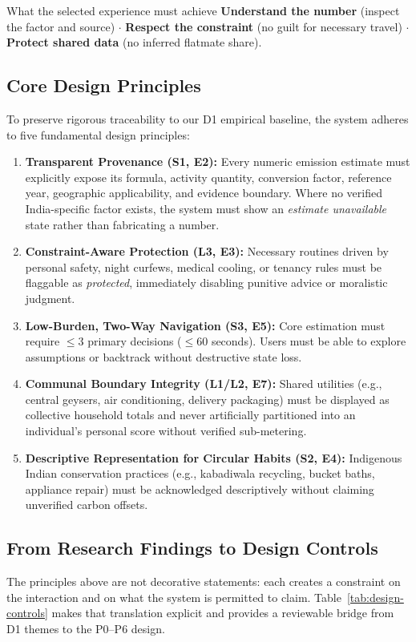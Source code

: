 \documentclass[12pt,a4paper]{article}
\begin{document}
\begin{chapterfocus}{What the selected experience must achieve}
\textbf{Understand the number} (inspect the factor and source) \quad $\cdot$ \quad
\textbf{Respect the constraint} (no guilt for necessary travel) \quad $\cdot$ \quad
\textbf{Protect shared data} (no inferred flatmate share).
\end{chapterfocus}

\subsection{Core Design Principles}
To preserve rigorous traceability to our D1 empirical baseline, the system adheres to five fundamental design principles:
\begin{enumerate}[label=\textbf{\color{Teal}DP\arabic*.},leftmargin=*,itemsep=0.68em,topsep=0.5em]
  \item \textbf{Transparent Provenance (S1, E2):} Every numeric emission estimate must explicitly expose its formula, activity quantity, conversion factor, reference year, geographic applicability, and evidence boundary. Where no verified India-specific factor exists, the system must show an \emph{estimate unavailable} state rather than fabricating a number.
  \item \textbf{Constraint-Aware Protection (L3, E3):} Necessary routines driven by personal safety, night curfews, medical cooling, or tenancy rules must be flaggable as \emph{protected}, immediately disabling punitive advice or moralistic judgment.
  \item \textbf{Low-Burden, Two-Way Navigation (S3, E5):} Core estimation must require $\le 3$ primary decisions ($\le 60$ seconds). Users must be able to explore assumptions or backtrack without destructive state loss.
  \item \textbf{Communal Boundary Integrity (L1/L2, E7):} Shared utilities (e.g., central geysers, air conditioning, delivery packaging) must be displayed as collective household totals and never artificially partitioned into an individual's personal score without verified sub-metering.
  \item \textbf{Descriptive Representation for Circular Habits (S2, E4):} Indigenous Indian conservation practices (e.g., kabadiwala recycling, bucket baths, appliance repair) must be acknowledged descriptively without claiming unverified carbon offsets.
\end{enumerate}

\subsection{From Research Findings to Design Controls}
The principles above are not decorative statements: each creates a constraint on the interaction and on what the system is permitted to claim. Table~\ref{tab:design-controls} makes that translation explicit and provides a reviewable bridge from D1 themes to the P0--P6 design.
\end{document}
